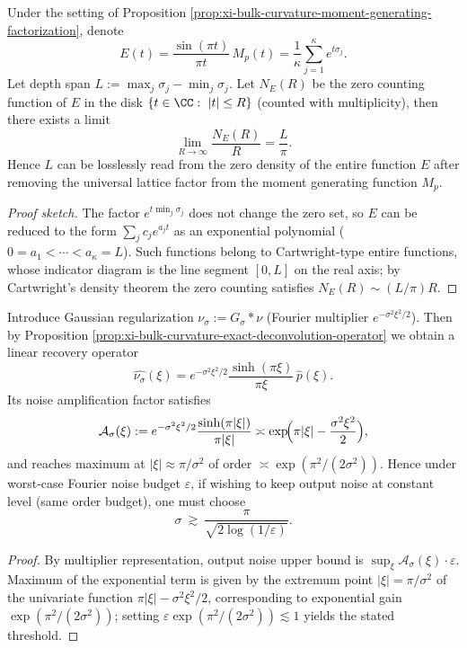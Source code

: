 \begin{proposition}\label{prop:xi-bulk-curvature-depth-span-zero-density}
Under the setting of Proposition \ref{prop:xi-bulk-curvature-moment-generating-factorization}, denote
\[
E(t)=\frac{\sin(\pi t)}{\pi t}\,M_p(t)=\frac{1}{\kappa}\sum_{j=1}^{\kappa}e^{t\sigma_j}.
\]
Let depth span
\(
L:=\max_j\sigma_j-\min_j\sigma_j
\).
Let \(N_E(R)\) be the zero counting function of \(E\) in the disk \(\{t\in\CC:\ |t|\le R\}\) (counted with multiplicity), then there exists a limit
\[
\boxed{\;\lim_{R\to\infty}\frac{N_E(R)}{R}=\frac{L}{\pi}.\;}
\]
Hence \(L\) can be losslessly read from the zero density of the entire function \(E\) after removing the universal lattice factor from the moment generating function \(M_p\).
\end{proposition}
\begin{proof}[Proof sketch]
The factor \(e^{t\min_j\sigma_j}\) does not change the zero set, so \(E\) can be reduced to the form \(\sum_{j}c_j e^{a_j t}\) as an exponential polynomial (\(0=a_1<\cdots<a_\kappa=L\)).
Such functions belong to Cartwright-type entire functions, whose indicator diagram is the line segment \([0,L]\) on the real axis; by Cartwright's density theorem the zero counting satisfies \(N_E(R)\sim (L/\pi)R\).
\end{proof}

\begin{corollary}\label{cor:xi-bulk-curvature-gaussian-regularization-threshold}
Introduce Gaussian regularization \(\nu_\sigma:=G_\sigma*\nu\) (Fourier multiplier \(e^{-\sigma^{2}\xi^{2}/2}\)).
Then by Proposition \ref{prop:xi-bulk-curvature-exact-deconvolution-operator} we obtain a linear recovery operator
\[
\widehat{\nu_\sigma}(\xi)=e^{-\sigma^{2}\xi^{2}/2}\frac{\sinh(\pi\xi)}{\pi\xi}\,\widehat p(\xi).
\]
Its noise amplification factor satisfies
\[
\mathcal A_\sigma(\xi):=e^{-\sigma^{2}\xi^{2}/2}\frac{\sinh(\pi|\xi|)}{\pi|\xi|}
\asymp
\exp\!\Bigl(\pi|\xi|-\frac{\sigma^{2}\xi^{2}}{2}\Bigr),
\]
and reaches maximum at \(|\xi|\approx \pi/\sigma^{2}\) of order \(\asymp \exp(\pi^{2}/(2\sigma^{2}))\).
Hence under worst-case Fourier noise budget \(\varepsilon\), if wishing to keep output noise at constant level (same order budget), one must choose
\[
\boxed{\;\sigma\ \gtrsim\ \frac{\pi}{\sqrt{2\log(1/\varepsilon)}}.\;}
\]
\end{corollary}
\begin{proof}
By multiplier representation, output noise upper bound is \(\sup_\xi \mathcal A_\sigma(\xi)\cdot\varepsilon\).
Maximum of the exponential term is given by the extremum point \(|\xi|=\pi/\sigma^{2}\) of the univariate function \(\pi|\xi|-\sigma^{2}\xi^{2}/2\), corresponding to exponential gain \(\exp(\pi^{2}/(2\sigma^{2}))\);
setting \(\varepsilon\exp(\pi^{2}/(2\sigma^{2}))\lesssim 1\) yields the stated threshold.
\end{proof}

